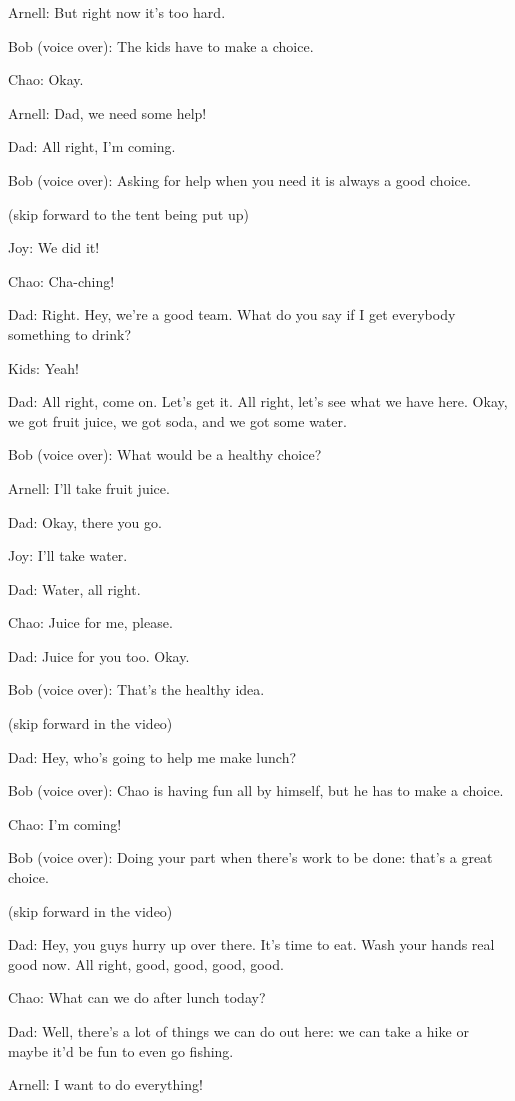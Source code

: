Arnell: But right now it's too hard.

Bob (voice over): The kids have to make a choice.

Chao: Okay.

Arnell: Dad, we need some help!

Dad: All right, I'm coming.

Bob (voice over): Asking for help when you need it is always a good choice.

(skip forward to the tent being put up)

Joy: We did it!

Chao: Cha-ching!

Dad: Right. Hey, we're a good team. What do you say if I get everybody something to drink?

Kids: Yeah!

Dad: All right, come on. Let's get it. All right, let's see what we have here. Okay, we got fruit juice, we got soda, and we got some water.

Bob (voice over): What would be a healthy choice?

Arnell: I'll take fruit juice.

Dad: Okay, there you go.

Joy: I'll take water.

Dad: Water, all right.

Chao: Juice for me, please.

Dad: Juice for you too. Okay.

Bob (voice over): That's the healthy idea.

(skip forward in the video)

Dad: Hey, who's going to help me make lunch?

Bob (voice over): Chao is having fun all by himself, but he has to make a choice.

Chao: I'm coming!

Bob (voice over): Doing your part when there's work to be done: that's a great choice.

(skip forward in the video)

Dad: Hey, you guys hurry up over there. It's time to eat. Wash your hands real good now. All right, good, good, good, good.

Chao: What can we do after lunch today?

Dad: Well, there's a lot of things we can do out here: we can take a hike or maybe it'd be fun to even go fishing.

Arnell: I want to do everything!

